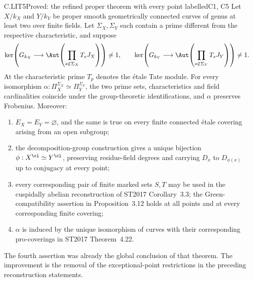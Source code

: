\begin{claim}{C.LIT5}{Proved: the refined proper theorem with every point labelled}{C1, C5}
Let $X/k_X$ and $Y/k_Y$ be proper smooth geometrically connected
curves of genus at least two over finite fields. Let $\Sigma_X,
\Sigma_Y$ each contain a prime different from the respective
characteristic, and suppose
\[
 \ker\!\left(G_{k_X}\longrightarrow
       \Aut\!\left(\prod_{s\notin\Sigma_X}T_sJ_X\right)\right)
 \ne1,
 \qquad
 \ker\!\left(G_{k_Y}\longrightarrow
       \Aut\!\left(\prod_{s\notin\Sigma_Y}T_sJ_Y\right)\right)
 \ne1.
\]
At the characteristic prime $T_p$ denotes the \'etale Tate module.
For every isomorphism $\alpha:\Pi_X^{\Sigma_X}\simeq
\Pi_Y^{\Sigma_Y}$, the two prime sets, characteristics and field
cardinalities coincide under the group-theoretic identifications,
and $\alpha$ preserves Frobenius. Moreover:
\begin{enumerate}
\item $E_X=E_Y=\varnothing$, and the same is true on every finite
connected \'etale covering arising from an open subgroup;
\item the decomposition-group construction gives a unique bijection
$\phi:X^{\cl}\simeq Y^{\cl}$, preserving residue-field degrees and
carrying $D_x$ to $D_{\phi(x)}$ up to conjugacy at every point;
\item every corresponding pair of finite marked sets $S,T$ may be
used in the cuspidally abelian reconstruction of ST2017
Corollary~3.3; the Green-compatibility assertion in Proposition~3.12
holds at all points and at every corresponding finite covering;
\item $\alpha$ is induced by the unique isomorphism of curves with
their corresponding pro-coverings in ST2017 Theorem~4.22.
\end{enumerate}
The fourth assertion was already the global conclusion of that
theorem. The improvement is the removal of the exceptional-point
restrictions in the preceding reconstruction statements.
\end{claim}
